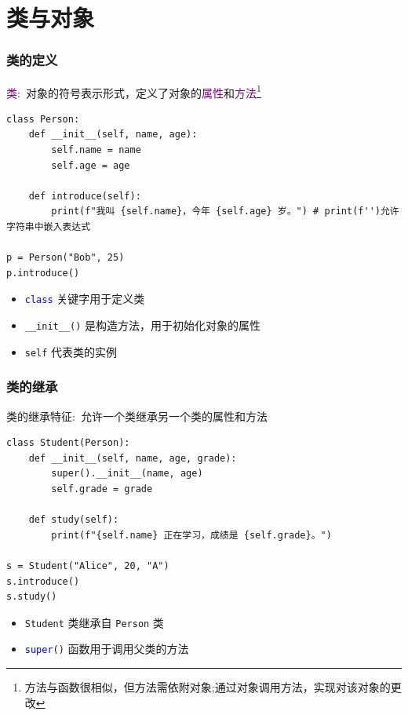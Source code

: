 \section{类与对象}
\begin{frame}[fragile]
    \frametitle{类的定义}
    \textcolor{purple}{类}:~对象的符号表示形式，定义了对象的\textcolor{purple}{属性}和\textcolor{purple}{方法}\footnote{\tiny 方法与函数很相似，但方法需依附对象;通过对象调用方法，实现对该对象的更改}
    \begin{lstlisting}[style=pythonstyle]
class Person:
    def __init__(self, name, age):
        self.name = name
        self.age = age

    def introduce(self):
        print(f"我叫 {self.name}，今年 {self.age} 岁。") # print(f'')允许字符串中嵌入表达式

p = Person("Bob", 25)
p.introduce()
    \end{lstlisting}
    \begin{itemize}
	    \item \texttt{\textcolor{blue}{class}} 关键字用于定义类
        \item \texttt{\_\_init\_\_()} 是构造方法，用于初始化对象的属性
        \item \texttt{self} 代表类的实例
    \end{itemize}
\end{frame}
%
\begin{frame}[fragile]
    \frametitle{类的继承}
    类的继承特征:~允许一个类继承另一个类的属性和方法
    \begin{lstlisting}[style=pythonstyle]
class Student(Person):
    def __init__(self, name, age, grade):
        super().__init__(name, age)
        self.grade = grade

    def study(self):
        print(f"{self.name} 正在学习，成绩是 {self.grade}。")

s = Student("Alice", 20, "A")
s.introduce()
s.study()
    \end{lstlisting}
    \begin{itemize}
        \item \texttt{Student} 类继承自 \texttt{Person} 类
	\item \texttt{\textcolor{blue}{super}()} 函数用于调用父类的方法
    \end{itemize}
\end{frame}
%
